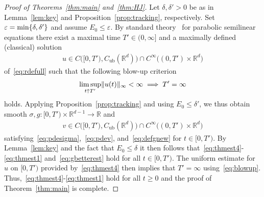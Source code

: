 \documentclass[12pt,oneside,a4paper,reqno]{amsart}
\numberwithin{equation}{section}
\theoremstyle{definition}
\theoremstyle{remark}
\newcommand{\bbR}{{\mathbb R}}
\newcommand{\eps}{\varepsilon}
\newcommand{\Cub}{{C_{\mathrm{ub}}}}
\DeclarePairedDelimiter{\norm}{\lVert}{\rVert}
\DeclarePairedDelimiter{\cur}{\{}{\}}
\begin{document}
\begin{proof}[Proof of Theorems~\ref{thm:main} and~\ref{thm:HJ}]
    Let $\delta,\delta' > 0$ be as in Lemma~\ref{lem:key} and Proposition~\ref{prop:tracking}, respectively. Set $\eps = \min\cur{\delta,\delta'}$ and assume $E_0 \leq \eps$.
    By standard theory~\cite{Lunardi_analytic_2013} for parabolic semilinear equations there exist a maximal time $T' \in (0,\infty]$ and a maximally defined (classical) solution
    \begin{align*}
     u \in C\big([0,T'),\Cub(\bbR^d)\big) \cap C^\infty\big((0,T') \times \bbR^d\big)
    \end{align*}
    of~\eqref{eq:rdefull} such that the following blow-up criterion
    \begin{equation}
        \label{eq:blowup}
        \limsup_{t \uparrow T'} \norm{u(t)}_{\infty} < \infty \implies T' = \infty 
    \end{equation}
    holds.
    Applying Proposition~\ref{prop:tracking} and using $E_0 \leq \delta'$, we thus obtain smooth $\sigma,g \colon [0,T') \times \bbR^{d-1} \to \bbR$ and
   \begin{align*}
    v \in C\big([0,T'),\Cub(\bbR^d)\big) \cap C^\infty\big((0,T') \times \bbR^d\big)
   \end{align*}satisfying~\eqref{eq:pdesigma},~\eqref{eq:pdev}, and~\eqref{eq:defgnew} for $t \in [0,T')$.
   By Lemma~\ref{lem:key} and the fact that $E_0 \leq \delta$ it then follows that~\eqref{eq:thmest4}-\eqref{eq:thmest1} and~\eqref{eq:gbetterest} hold for all $t \in [0,T')$. The uniform estimate for $u$ on $[0,T')$ provided by~\eqref{eq:thmest4} then implies that $T' = \infty$ using~\eqref{eq:blowup}. Thus,~\eqref{eq:thmest4}-\eqref{eq:thmest1} hold for all $t \geq 0$ and the proof of Theorem~\ref{thm:main} is complete.


\end{proof}
\end{document}
